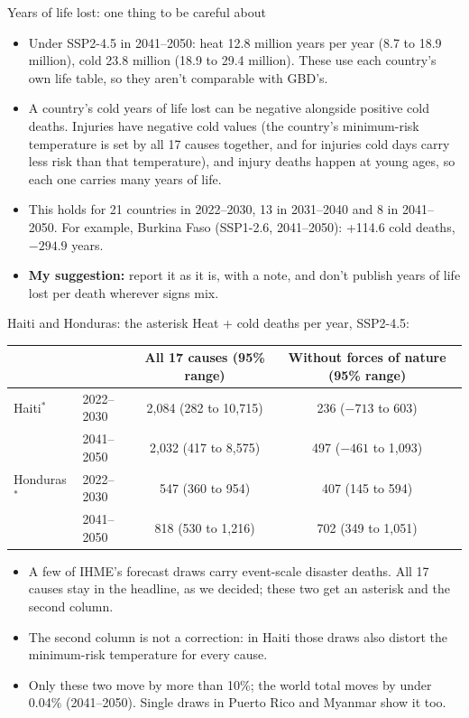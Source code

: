 \documentclass[aspectratio=169,11pt]{beamer}
\begin{document}
\begin{frame}{Years of life lost: one thing to be careful about}
  \begin{itemize}
    \item Under SSP2-4.5 in 2041--2050: heat 12.8 million years per year (8.7 to 18.9 million), cold 23.8 million (18.9 to 29.4 million). These use each country's own life table, so they aren't comparable with GBD's.
    \item A country's cold years of life lost can be negative alongside positive cold deaths. Injuries have negative cold values (the country's minimum-risk temperature is set by all 17 causes together, and for injuries cold days carry less risk than that temperature), and injury deaths happen at young ages, so each one carries many years of life.
    \item This holds for 21 countries in 2022--2030, 13 in 2031--2040 and 8 in 2041--2050. For example, Burkina Faso (SSP1-2.6, 2041--2050): +114.6 cold deaths, $-294.9$ years.
    \item \textbf{My suggestion:} report it as it is, with a note, and don't publish years of life lost per death wherever signs mix.
  \end{itemize}
\end{frame}

\begin{frame}{Haiti and Honduras: the asterisk}
  \small
  Heat + cold deaths per year, SSP2-4.5:

  \medskip
  \centering
  \begin{tabular}{llcc}
    \toprule
    & & All 17 causes (95\% range) & Without forces of nature (95\% range) \\
    \midrule
    Haiti$^{*}$    & 2022--2030 & 2,084 (282 to 10,715) & 236 ($-713$ to 603) \\
                   & 2041--2050 & 2,032 (417 to 8,575)  & 497 ($-461$ to 1,093) \\
    Honduras$^{*}$ & 2022--2030 & 547 (360 to 954)      & 407 (145 to 594) \\
                   & 2041--2050 & 818 (530 to 1,216)    & 702 (349 to 1,051) \\
    \bottomrule
  \end{tabular}

  \medskip
  \raggedright
  \begin{itemize}
    \item A few of IHME's forecast draws carry event-scale disaster deaths. All 17 causes stay in the headline, as we decided; these two get an asterisk and the second column.
    \item The second column is not a correction: in Haiti those draws also distort the minimum-risk temperature for every cause.
    \item Only these two move by more than 10\%; the world total moves by under 0.04\% (2041--2050). Single draws in Puerto Rico and Myanmar show it too.
  \end{itemize}
\end{frame}
\end{document}
